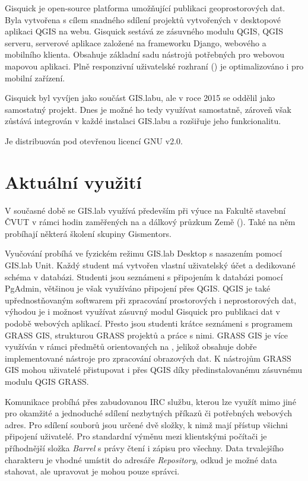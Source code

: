 Gisquick je open-source platforma umožňující publikaci geoprostorových
dat. Byla vytvořena s cílem snadného sdílení projektů vytvořených v
desktopové aplikaci QGIS na webu. Gisquick sestává ze zásuvného modulu
QGIS, QGIS serveru, serverové aplikace založené na frameworku Django,
webového a mobilního klienta. Obsahuje základní sadu nástrojů
potřebných pro webovou mapovou aplikaci. Plně responzivní uživatelské
rozhraní () je optimalizováno i pro mobilní zařízení.

Gisquick byl vyvíjen jako součást GIS.labu, ale v roce 2015 se oddělil
jako samostatný projekt. Dnes je možné ho tedy využívat samostatně,
zároveň však zůstává integrován v každé instalaci GIS.labu a rozšiřuje
jeho funkcionalitu.

Je distribuován pod otevřenou licencí GNU  v2.0.

\section{Aktuální využití}
\label{gislab-vyuziti}

V současné době se GIS.lab využívá především při výuce na Fakultě
stavební ČVUT v rámci hodin zaměřených na  a dálkový průzkum
Země (). Také na něm probíhají některá školení skupiny
Gismentors.

Vyučování probíhá ve fyzickém režimu GIS.lab Desktop s nasazením
pomocí GIS.lab Unit. Každý student má vytvořen vlastní uživatelský
účet a dedikované schéma v databázi. Studenti jsou seznámeni s
připojením k databázi pomocí PgAdmin, většinou je však využíváno
připojení přes QGIS. QGIS je také upřednostňovaným softwarem při
zpracování prostorových i neprostorových dat, výhodou je i možnost
využívat zásuvný modul Gisquick pro publikaci dat v podobě webových
aplikací. Přesto jsou studenti krátce seznámeni s programem GRASS GIS,
strukturou GRASS projektů a práce s nimi. GRASS GIS je více využíván v
rámci předmětů orientovaných na , jelikož obsahuje dobře
implementované nástroje pro zpracování obrazových dat. K nástrojům
GRASS GIS mohou uživatelé přistupovat i přes QGIS  díky
předinstalovanému zásuvnému modulu QGIS GRASS.

Komunikace probíhá přes zabudovanou IRC službu, kterou lze využít mimo
jiné pro okamžité a jednoduché sdílení nezbytných příkazů či
potřebných webových adres. Pro sdílení souborů jsou určené dvě složky,
k nimž mají přístup všichni připojení uživatelé. Pro standardní výměnu
mezi klientskými počítači je příhodnější složka \textit{Barrel} s
právy čtení i zápisu pro všechny. Data trvalejšího charakteru je
vhodné umístit do adresáře \textit{Repository}, odkud je možné data
stahovat, ale upravovat je mohou pouze správci.

